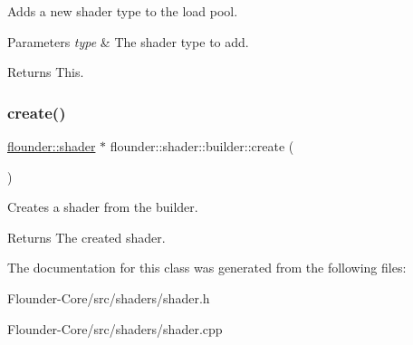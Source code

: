 Adds a new shader type to the load pool. 


\begin{DoxyParams}{Parameters}
{\em type} & The shader type to add. \\
\hline
\end{DoxyParams}
\begin{DoxyReturn}{Returns}
This. 
\end{DoxyReturn}
\mbox{\label{classflounder_1_1shader_1_1builder_a99923013d39273486149c8fd54f6f9a9}} 
\subsubsection{\texorpdfstring{create()}{create()}}
{\footnotesize\ttfamily \hyperlink{classflounder_1_1shader}{flounder\+::shader} $\ast$ flounder\+::shader\+::builder\+::create (\begin{DoxyParamCaption}{ }\end{DoxyParamCaption})}



Creates a shader from the builder. 

\begin{DoxyReturn}{Returns}
The created shader. 
\end{DoxyReturn}


The documentation for this class was generated from the following files\+:\begin{DoxyCompactItemize}
\item 
Flounder-\/\+Core/src/shaders/shader.\+h\item 
Flounder-\/\+Core/src/shaders/shader.\+cpp\end{DoxyCompactItemize}
